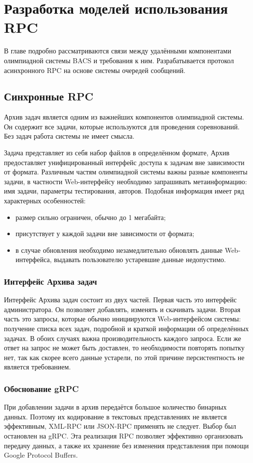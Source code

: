 \chapter{Разработка моделей использования RPC}
В главе подробно рассматриваются связи между удалёнными компонентами
олимпиадной системы BACS и требования к ним. Разрабатывается
протокол асинхронного RPC на основе системы очередей сообщений.

\section{Синхронные RPC}
Архив задач является одним из важнейших компонентов олимпиадной системы.
Он содержит все задачи, которые используются для проведения соревнований.
Без задач работа системы не имеет смысла.

Задача представляет из себя набор файлов в определённом формате,
Архив предоставляет унифицированный интерфейс доступа к задачам
вне зависимости от формата. Различным частям олимпиадной системы важны
разные компоненты задачи, в частности Web-интерфейсу необходимо запрашивать
метаинформацию: имя задачи, параметры тестирования, авторов. Подобная
информация имеет ряд характерных особенностей:
\begin{itemize}
    \item размер сильно ограничен, обычно до 1 мегабайта;
    \item присутствует у каждой задачи вне зависимости от формата;
    \item в случае обновления необходимо незамедлительно обновлять
        данные Web-интерфейса, выдавать пользователю устаревшие данные
        недопустимо.
\end{itemize}

\subsection{Интерфейс Архива задач}
Интерфейс Архива задач состоит из двух частей. Первая часть это интерфейс
администратора. Он позволяет добавлять, изменять и скачивать задачи.
Вторая часть это запросы, которые обычно инициируются Web-интерфейсом
системы: получение списка всех задач, подробной и краткой информации
об определённых задачах. В обоих случаях важна производительность каждого
запроса. Если же ответ на запрос не может быть доставлен, то необходимости
повторять попытку нет, так как скорее всего данные устарели, по этой причине
персистентность не является требованием.

\subsection{Обоснование gRPC}
При добавлении задачи в архив передаётся большое количество бинарных данных.
Поэтому их кодирование в текстовых представлениях не является эффективным,
XML-RPC или JSON-RPC применять не следует. Выбор был остановлен на gRPC.
Эта реализация RPC позволяет эффективно организовать передачу данных,
а также их хранение без изменения представления при помощи Google Protocol
Buffers.

